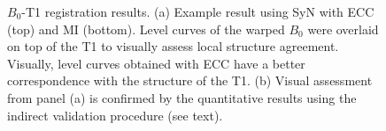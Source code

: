 \begin{figure}[t!]
\centering
    \caption{{\small $B_{0}$-T1 registration results. (a) Example result using SyN with ECC (top) and MI (bottom). Level curves of the warped $B_{0}$ were overlaid on top of the T1 to visually assess local structure agreement. Visually, level curves obtained with ECC have a better correspondence with the structure of the T1. (b) Visual assessment from panel (a) is confirmed by the quantitative results using the indirect validation procedure (see text).}}
\label{fig:comparison_B0_T1_coregistration}\figcloser
\end{figure}

